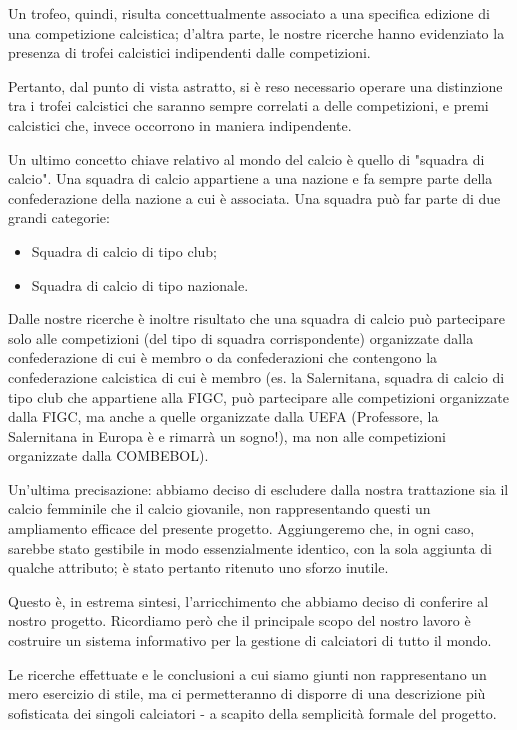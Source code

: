 Un trofeo, quindi, risulta concettualmente associato a una specifica edizione di una competizione
calcistica; d'altra parte, le nostre ricerche hanno evidenziato la presenza di trofei calcistici
indipendenti dalle competizioni.


Pertanto, dal punto di vista astratto, si è reso necessario operare una distinzione tra i trofei calcistici
che saranno sempre correlati a delle competizioni, e premi calcistici che, invece
occorrono in maniera indipendente.

Un ultimo concetto chiave relativo al mondo del calcio è quello di "squadra di calcio".
Una squadra di calcio appartiene a una nazione e fa sempre parte della
confederazione della nazione a cui è associata.
Una squadra può far parte di due grandi categorie:
\begin{itemize}
	\item Squadra di calcio di tipo club;
	\item Squadra di calcio di tipo nazionale.
\end{itemize}

Dalle nostre ricerche è inoltre risultato che una squadra di calcio può partecipare
solo alle competizioni (del tipo di squadra corrispondente) organizzate dalla confederazione
di cui è membro o da confederazioni che contengono la confederazione calcistica di cui
è membro (es. la Salernitana, squadra di calcio di tipo club che appartiene alla FIGC,
può partecipare alle competizioni organizzate dalla FIGC, ma anche a quelle organizzate
dalla UEFA (Professore, la Salernitana in Europa è e rimarrà un sogno!),
ma non alle competizioni organizzate dalla COMBEBOL).

Un'ultima precisazione: abbiamo deciso di escludere dalla nostra trattazione sia il calcio
femminile che il calcio giovanile, non rappresentando questi un ampliamento efficace del presente progetto.
Aggiungeremo che, in ogni caso, sarebbe stato gestibile in modo essenzialmente identico, con la sola aggiunta di qualche attributo; è stato pertanto ritenuto uno sforzo inutile.

\bigskip
\bigskip

Questo è, in estrema sintesi, l'arricchimento che abbiamo deciso di conferire al nostro progetto.
Ricordiamo però che il principale scopo del nostro lavoro è costruire un sistema informativo
per la gestione di calciatori di tutto il mondo.

Le ricerche effettuate e le conclusioni a cui siamo giunti non rappresentano
un mero esercizio di stile, ma ci permetteranno di disporre di una descrizione più sofisticata dei singoli calciatori - a scapito della semplicità formale del progetto.

